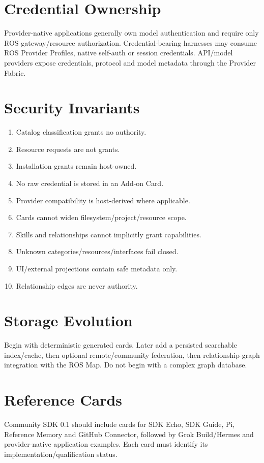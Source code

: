 \documentclass{article}
\begin{document}
\section{Credential Ownership}
Provider-native applications generally own model authentication and require only ROS gateway/resource authorization. Credential-bearing harnesses may consume ROS Provider Profiles, native self-auth or session credentials. API/model providers expose credentials, protocol and model metadata through the Provider Fabric.

\section{Security Invariants}
\begin{enumerate}[leftmargin=*]
\item Catalog classification grants no authority.
\item Resource requests are not grants.
\item Installation grants remain host-owned.
\item No raw credential is stored in an Add-on Card.
\item Provider compatibility is host-derived where applicable.
\item Cards cannot widen filesystem/project/resource scope.
\item Skills and relationships cannot implicitly grant capabilities.
\item Unknown categories/resources/interfaces fail closed.
\item UI/external projections contain safe metadata only.
\item Relationship edges are never authority.
\end{enumerate}

\section{Storage Evolution}
Begin with deterministic generated cards. Later add a persisted searchable index/cache, then optional remote/community federation, then relationship-graph integration with the ROS Map. Do not begin with a complex graph database.

\section{Reference Cards}
Community SDK 0.1 should include cards for SDK Echo, SDK Guide, Pi, Reference Memory and GitHub Connector, followed by Grok Build/Hermes and provider-native application examples. Each card must identify its implementation/qualification status.
\end{document}
